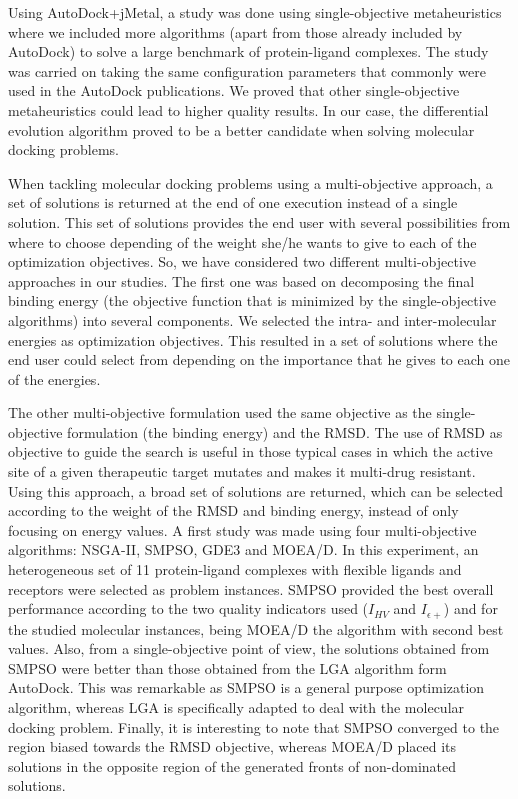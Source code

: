 Using AutoDock+jMetal, a study was done using single-objective metaheuristics where we included more algorithms (apart from those already included by AutoDock) to solve a large benchmark of protein-ligand complexes. The study was carried on taking the same configuration parameters that commonly were used in the AutoDock publications. We proved that other single-objective metaheuristics could lead to higher quality results. In our case, the differential evolution algorithm proved to be a better candidate when solving molecular docking problems.

When tackling molecular docking problems using a multi-objective approach, a set of solutions  is returned at the end of one execution instead of a single solution. This set of solutions provides the end user with several possibilities from where to choose depending of the weight she/he wants to give to each of the optimization objectives. So, we have considered two different multi-objective approaches in our studies. The first one was based on decomposing the final binding energy (the objective function that is minimized by the single-objective algorithms) into several components. We selected the intra- and inter-molecular energies as optimization objectives. This resulted in a set of solutions where the end user could select from depending on the importance that he gives to each one of the energies.

The other multi-objective formulation used the same objective as the single-objective formulation (the binding energy) and the RMSD. The use of RMSD as objective to guide the search is useful in those typical cases in which the active site of a given therapeutic target mutates and makes it multi-drug resistant. Using this approach, a broad set of solutions are returned, which can be selected according to the weight of the RMSD and binding energy, instead of only focusing on energy values. A first study was made using four multi-objective algorithms: NSGA-II, SMPSO, GDE3 and MOEA/D. In this experiment, an heterogeneous set of 11 protein-ligand complexes with flexible ligands and receptors were selected as problem instances. SMPSO provided the best overall performance according to the two quality indicators used ($I_{HV}$ and $I_{\epsilon+}$) and for the studied molecular instances, being MOEA/D the algorithm with second best values. Also, from a single-objective point of view, the solutions obtained from SMPSO were better than those obtained from the LGA algorithm form AutoDock. This was remarkable as SMPSO is a general purpose optimization algorithm, whereas LGA is specifically adapted to deal with the molecular docking problem. Finally, it is interesting to note that SMPSO converged to the region biased towards the RMSD objective, whereas MOEA/D placed its solutions in the opposite region of the generated fronts of non-dominated solutions.

